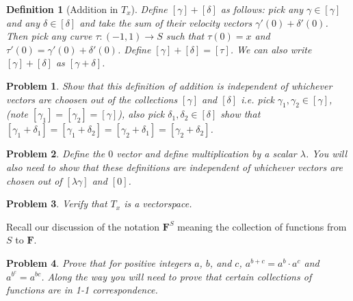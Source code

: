 \documentclass{article}
\theoremstyle{problemstyle}
\newtheorem{problem}{Problem}
\theoremstyle{problemstyle}
\theoremstyle{problemstyle}
\newtheorem{definition}{Definition}
\begin{document}
\begin{definition}[Addition in $T_x$]
Define $[\gamma]+[\delta]$ as follows: pick any $\gamma \in [\gamma]$ and any $\delta \in [\delta]$ and take the sum of their velocity vectors $\gamma'(0)+\delta'(0)$. Then pick any curve $\tau:(-1,1)\rightarrow S$ such that $\tau(0)=x$ and $\tau'(0)=\gamma'(0)+\delta'(0)$. Define $[\gamma]+[\delta] = [\tau]$.  We can also write $[\gamma]+[\delta]$ as $[\gamma+\delta]$.
\end{definition}

\begin{problem}
Show that this definition of addition is independent of whichever vectors are choosen out of the collections $[\gamma]$ and $[\delta]$ i.e. pick $\gamma_1,\gamma_2 \in [\gamma]$, (note $[\gamma_1] = [\gamma_2] = [\gamma]$), also pick $\delta_1,\delta_2 \in [\delta]$ show that $[\gamma_1 + \delta_1] = [\gamma_1 + \delta_2]=[\gamma_2 + \delta_1]=[\gamma_2 + \delta_2]$. 
\end{problem}

\begin{problem}
Define the $0$ vector and define multiplication by a scalar $\lambda$. You will also need to show that these definitions are independent of whichever vectors are chosen out of $[\lambda\gamma]$ and $[0]$. 
\end{problem}

\begin{problem}
Verify that $T_x$ is a vectorspace. 
\end{problem}

Recall our discussion of the notation $\textbf{F}^S$ meaning the collection of functions from $S$ to $\textbf{F}$.

\begin{problem}
Prove that for positive integers $a$, $b$, and $c$, $a^{b+c} = a^b\cdot a^c$ and $a^{b^c} = a^{bc}$. Along the way you will need to prove that certain collections of functions are in 1-1 correspondence. 
\end{problem}
\end{document}

